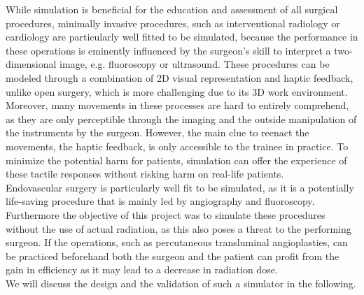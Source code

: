 While simulation is beneficial for the education and assessment of all surgical procedures, minimally invasive procedures, such as interventional radiology or cardiology are particularly well fitted to be simulated, because the performance in these operations is eminently influenced by the surgeon’s skill to interpret a two-dimensional image, e.g. fluoroscopy or ultrasound.\parencite{johnson_virtual_2012}\parencite{green_current_2014} These procedures can be modeled through a combination of 2D visual representation and haptic feedback, unlike open surgery, which is more challenging due to its 3D work environment\parencite{pandey_expanding_2012}. Moreover, many movements in these processes are hard to entirely comprehend, as they are only perceptible through the imaging and the outside manipulation of the instruments by the surgeon. However, the main clue to reenact the movements, the haptic feedback, is only accessible to the trainee in practice. To minimize the potential harm for patients, simulation can offer the experience of these tactile responses without risking harm on real-life patients\parencite{johnson_development_2011}. \\
Endovascular surgery is particularly well fit to be simulated, as it is a potentially life-saving procedure that is mainly led by angiography and fluoroscopy. Furthermore the objective of this project was to simulate these procedures without the use of actual radiation, as this also poses a threat to the performing surgeon. If the operations, such as percutaneous transluminal angioplasties, can be practiced beforehand both the surgeon and the patient can profit from the gain in efficiency as it may lead to a decrease in radiation dose.\\
We will discuss the design and the validation of such a simulator in the following. 